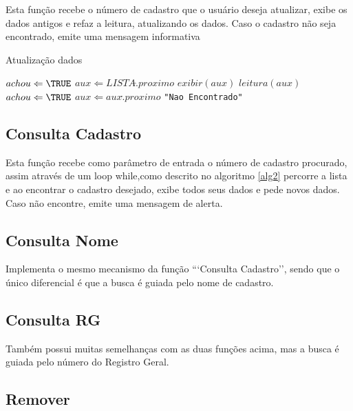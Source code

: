 \documentclass[12pt]{article}
\begin{document}
Esta função recebe o número de cadastro que o usuário deseja atualizar,
exibe os dados antigos e refaz a leitura, atualizando os dados. Caso
o cadastro não seja encontrado, emite uma mensagem informativa


\begin{algorithm}                      %
\caption{Atualização dados}          %
\label{alg2}                           %
\begin{algorithmic}                    %
    \STATE $achou \Leftarrow \TRUE$
    \STATE $aux \Leftarrow LISTA\hat.proximo$
        \STATE $exibir(aux)$
        \STATE $leitura(aux)$
        \STATE $achou \Leftarrow \TRUE$
      \ENDIF  
    \STATE $aux \Leftarrow aux\hat.proximo$
    \ENDWHILE
      \PRINT \texttt{"Nao Encontrado"}
    \ENDIF
\end{algorithmic}
\end{algorithm}  


\subsection{Consulta Cadastro}

Esta função recebe como parâmetro de entrada o número de cadastro procurado, assim
através de um loop while,como descrito no algoritmo \ref{alg2} percorre a lista e ao encontrar o cadastro desejado, exibe
todos seus dados e pede novos dados. Caso não encontre, emite uma mensagem de alerta. 

\subsection{Consulta Nome}

Implementa o mesmo mecanismo da função ```Consulta Cadastro'', sendo que o único diferencial
é que a busca é guiada pelo nome de cadastro.

\subsection{Consulta RG}

Também possui muitas semelhanças com as duas funções acima, mas a busca é guiada pelo número
do Registro Geral.

\subsection{Remover}
\end{document}
